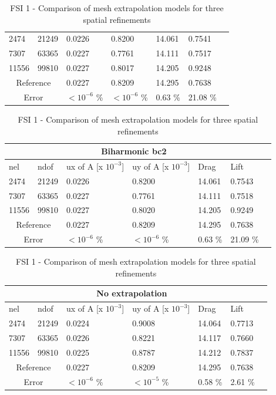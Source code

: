 \begin{table}[h!]
\begin{tabular}{ |p{1cm}||p{1cm}|p{2.8cm}|p{2.8cm}|p{2.7cm}|p{2.7cm}|p{1.2cm}|}
 \hline
 2474    & 21249  &       0.0226 &       0.8200 & 14.061 & 0.7541 \\
 7307    & 63365  &       0.0227  &       0.7761 & 14.111 & 0.7517 \\
 11556   & 99810  &       0.0227  &       0.8017 & 14.205 & 0.9248 \\
  \hline
 \multicolumn{2}{|c|}{Reference} &  0.0227      &       0.8209      & 14.295  & 0.7638   \\
 \hline
    \multicolumn{2}{|c|}{Error}  & $ < 10^{-6}$  \% &  $ <10^{-6}$  \%  & 0.63 \% & 21.08 \% \\
 \hline
\end{tabular}
\begin{tabular}{ |p{1cm}||p{1cm}|p{2.8cm}|p{2.8cm}|p{2.7cm}|p{2.7cm}|p{1.2cm}|}
 \hline
  \multicolumn{6}{|c|}{Biharmonic bc2} \\
   \hline
nel & ndof & ux of A [x $10^{-3}$]  &uy of A [x $10^{-3}$]& Drag  & Lift \\
 \hline
 2474    & 21249  &       0.0226 &       0.8200 & 14.061 & 0.7543 \\
 7307    & 63365  &       0.0227 &       0.7761 & 14.111 & 0.7518 \\
 11556   & 99810  &       0.0227 &       0.8020 & 14.205 & 0.9249  \\
  \hline
 \multicolumn{2}{|c|}{Reference} &  0.0227      &       0.8209      & 14.295  & 0.7638   \\
 \hline
    \multicolumn{2}{|c|}{Error}  & $ < 10^{-6}$  \% &  $ <10^{-6}$  \%  & 0.63 \% & 21.09 \% \\
 \hline
\end{tabular}
\begin{tabular}{ |p{1cm}||p{1cm}|p{2.8cm}|p{2.8cm}|p{2.7cm}|p{2.7cm}|p{1.2cm}|}
 \hline
  \multicolumn{6}{|c|}{No extrapolation} \\
   \hline
nel & ndof & ux of A [x $10^{-3}$]  &uy of A [x $10^{-3}$]& Drag  & Lift \\
 \hline
 2474    & 21249  &       0.0224 &       0.9008 & 14.064 & 0.7713 \\
 7307    & 63365  &       0.0226  &       0.8221 & 14.117 & 0.7660 \\
 11556   & 99810  &       0.0225 &       0.8787 & 14.212 & 0.7837 \\
   \hline
 \multicolumn{2}{|c|}{Reference} &  0.0227      &       0.8209      & 14.295  & 0.7638   \\
 \hline
    \multicolumn{2}{|c|}{Error}  &   $ < 10^{-6}$  \% &  $ <10^{-5}$  \% & 0.58 \% & 2.61 \%  \\
 \hline
\end{tabular}
\caption{FSI 1 - Comparison of mesh extrapolation models for three spatial refinements}
\end{table}
\newpage
